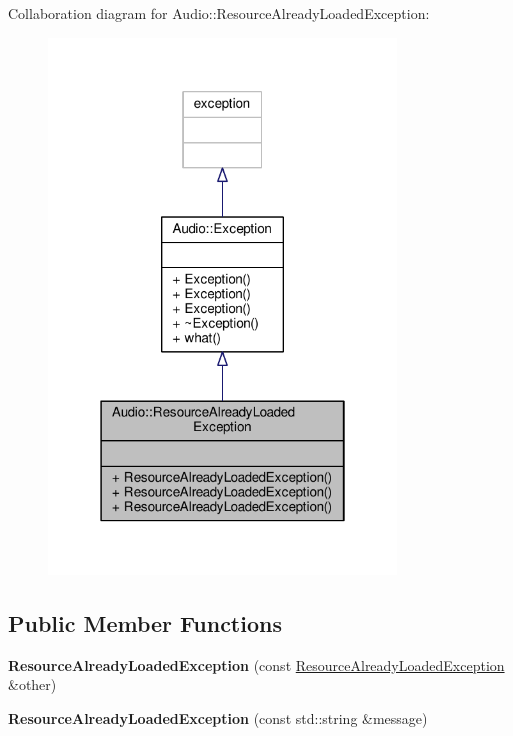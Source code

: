 Collaboration diagram for Audio\+:\+:Resource\+Already\+Loaded\+Exception\+:
\nopagebreak
\begin{figure}[H]
\begin{center}
\leavevmode
\includegraphics[width=262pt]{d0/dbb/classAudio_1_1ResourceAlreadyLoadedException__coll__graph}
\end{center}
\end{figure}
\subsection*{Public Member Functions}
\begin{DoxyCompactItemize}
\item 
{\bfseries Resource\+Already\+Loaded\+Exception} (const \hyperlink{classAudio_1_1ResourceAlreadyLoadedException}{Resource\+Already\+Loaded\+Exception} \&other)\hypertarget{classAudio_1_1ResourceAlreadyLoadedException_a824fbe5300506167dd79e61e8ac679fc}{}\label{classAudio_1_1ResourceAlreadyLoadedException_a824fbe5300506167dd79e61e8ac679fc}

\item 
{\bfseries Resource\+Already\+Loaded\+Exception} (const std\+::string \&message)\hypertarget{classAudio_1_1ResourceAlreadyLoadedException_a575a0f668b676c4b687b5b8d796d9f36}{}\label{classAudio_1_1ResourceAlreadyLoadedException_a575a0f668b676c4b687b5b8d796d9f36}

\end{DoxyCompactItemize}


